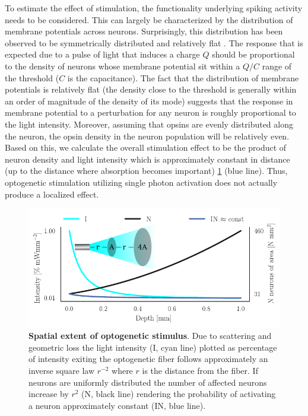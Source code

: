 \documentclass[11pt]{article}
\begin{document}
To estimate the effect of stimulation, the functionality underlying spiking activity needs to be considered. This can largely be characterized by the  distribution of membrane potentials across neurons. Surprisingly, this distribution has been observed to be symmetrically distributed and relatively flat \citep{pare1998impact,destexhe1999impact,rudolph2006use}. The response that is expected due to a pulse of light that induces a charge $Q$ should be proportional to the density of neurons whose membrane potential sit within a $Q/C$ range of the threshold ($C$ is the capacitance). The fact that the distribution of membrane potentials is relatively flat (the density close to the threshold is generally within an order of magnitude of the density of its mode) suggests that the response in membrane potential to a perturbation for any neuron is roughly proportional to the light intensity. Moreover, assuming that opsins are evenly distributed along the neuron, the opsin density in the neuron population will be relatively even. Based on this, we calculate the overall stimulation effect to be the product of neuron density and light intensity which is approximately constant in distance (up to the distance where absorption becomes important) \cref{fig:concept} (blue line). Thus, optogenetic stimulation utilizing single photon activation does not actually produce a localized effect. 

\begin{figure}\includegraphics[scale=1]{opto-powerlaw}
\caption{{\bf Spatial extent of optogenetic stimulus}. Due to scattering and geometric loss the light intensity (I, cyan line) plotted as percentage of intensity exiting the optogenetic fiber follows approximately an inverse square law $ r^{-2} $ where $ r $ is the distance from the fiber. If neurons are uniformly distributed the number of affected neurons increase by $ r^{2} $ (N, black line) rendering the probability of activating a neuron approximately constant (IN, blue line). \label{fig:concept}}
\end{figure}
\end{document}
